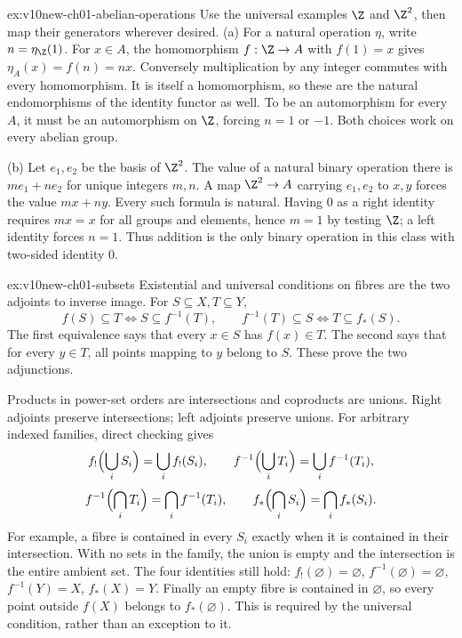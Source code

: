 \begin{solution}{ex:v10new-ch01-abelian-operations}
\idea Use the universal examples $\Z$ and $\Z^2$, then map their generators wherever desired.
\writeup (a) For a natural operation $\eta$, write $n=\eta_{\Z}(1)$. For $x\in A$, the homomorphism $f:\Z\to A$ with $f(1)=x$ gives $\eta_A(x)=f(n)=nx$. Conversely multiplication by any integer commutes with every homomorphism. It is itself a homomorphism, so these are the natural endomorphisms of the identity functor as well. To be an automorphism for every $A$, it must be an automorphism on $\Z$, forcing $n=1$ or $-1$. Both choices work on every abelian group.

(b) Let $e_1,e_2$ be the basis of $\Z^2$. The value of a natural binary operation there is $me_1+ne_2$ for unique integers $m,n$. A map $\Z^2\to A$ carrying $e_1,e_2$ to $x,y$ forces the value $mx+ny$. Every such formula is natural. Having $0$ as a right identity requires $mx=x$ for all groups and elements, hence $m=1$ by testing $\Z$; a left identity forces $n=1$. Thus addition is the only binary operation in this class with two-sided identity $0$.
\end{solution}

\begin{solution}{ex:v10new-ch01-subsets}
\idea Existential and universal conditions on fibres are the two adjoints to inverse image.
\writeup For $S\subseteq X,T\subseteq Y$,
\[
f(S)\subseteq T\iff S\subseteq f^{-1}(T),
\qquad
f^{-1}(T)\subseteq S\iff T\subseteq f_*(S).
\]
The first equivalence says that every $x\in S$ has $f(x)\in T$. The second says that for every $y\in T$, all points mapping to $y$ belong to $S$. These prove the two adjunctions.

Products in power-set orders are intersections and coproducts are unions. Right adjoints preserve intersections; left adjoints preserve unions. For arbitrary indexed families, direct checking gives
\[
f_!\Bigl(\bigcup_iS_i\Bigr)=\bigcup_i f_!(S_i),\qquad
f^{-1}\Bigl(\bigcup_iT_i\Bigr)=\bigcup_i f^{-1}(T_i),
\]
\[
f^{-1}\Bigl(\bigcap_iT_i\Bigr)=\bigcap_i f^{-1}(T_i),\qquad
f_*\Bigl(\bigcap_iS_i\Bigr)=\bigcap_i f_*(S_i).
\]
For example, a fibre is contained in every $S_i$ exactly when it is contained in their intersection. With no sets in the family, the union is empty and the intersection is the entire ambient set. The four identities still hold: $f_!(\varnothing)=\varnothing$, $f^{-1}(\varnothing)=\varnothing$, $f^{-1}(Y)=X$, $f_*(X)=Y$. Finally an empty fibre is contained in $\varnothing$, so every point outside $f(X)$ belongs to $f_*(\varnothing)$. This is required by the universal condition, rather than an exception to it.
\end{solution}

